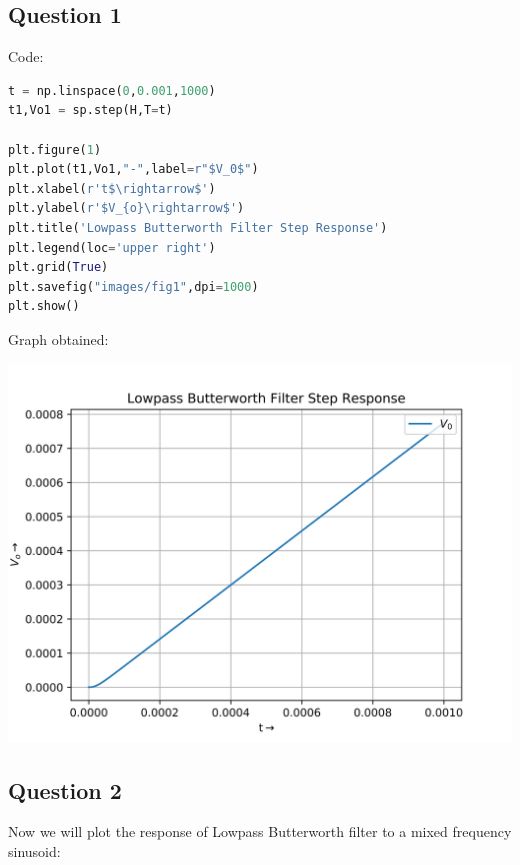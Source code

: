 \documentclass[12pt]{article}
\begin{document}
\subsection{Question 1}
Code:
\begin{lstlisting}[language=Python]
t = np.linspace(0,0.001,1000)
t1,Vo1 = sp.step(H,T=t)

plt.figure(1)
plt.plot(t1,Vo1,"-",label=r"$V_0$")
plt.xlabel(r't$\rightarrow$')
plt.ylabel(r'$V_{o}\rightarrow$')
plt.title('Lowpass Butterworth Filter Step Response')
plt.legend(loc='upper right')
plt.grid(True)
plt.savefig("images/fig1",dpi=1000)
plt.show()
\end{lstlisting}
Graph obtained:
\begin{center}
    \includegraphics[scale=0.8]{images/fig1.png}
\end{center}
\pagebreak
\subsection{Question 2}

Now we will plot the response of Lowpass Butterworth filter to a mixed frequency sinusoid:
\end{document}
